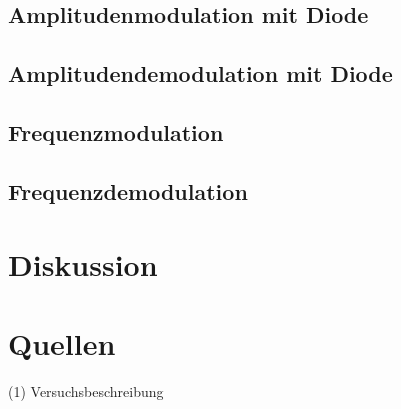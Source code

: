 \documentclass[]{scrartcl}
\begin{document}
\subsection{Amplitudenmodulation mit Diode}

\subsection{Amplitudendemodulation mit Diode}

\subsection{Frequenzmodulation}

\subsection{Frequenzdemodulation}

\section{Diskussion}

\section{Quellen}
(1) Versuchsbeschreibung
\end{document}
